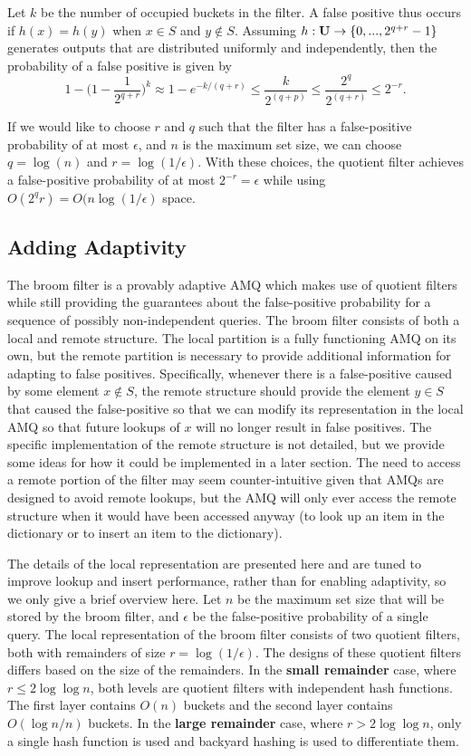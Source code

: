 \documentclass[../paper.tex]{subfiles}
\begin{document}
    Let $k$ be the number of occupied buckets in the filter. A false positive thus occurs if $h(x) =
    h(y)$ when $x \in S$ and $y \notin S$.  Assuming $h: {\bf U} \rightarrow
    \{0, ... , 2^{q+r}-1\}$ generates outputs that are distributed uniformly
    and independently, then the probability of a false positive is given by $$
    1 - \big(1 - \frac{1}{2^{q+r}}\big)^k \approx 1- e^{-k/(q+r)} \leq
    \frac{k}{2^{(q+p)}} \leq \frac{2^q}{2^{(q+r)}} \leq 2^{-r}.$$

    If we would like to choose $r$ and $q$ such that the filter has a false-positive
    probability of at most $\epsilon$, and $n$ is the maximum set size, we can choose $q=\log(n)$
    and $r=\log(1/\epsilon)$.
    With these choices, the quotient filter achieves a false-positive probability of at most
    $2^{-r} = \epsilon$ while using $O(2^q r) = O(n \log (1/\epsilon)$ space.  	

\subsection{Adding Adaptivity}

The broom filter is a provably adaptive AMQ which makes use of quotient filters
while still providing the guarantees about the false-positive probability for
a sequence of possibly non-independent queries. The broom filter consists
of both a local and remote structure. The local partition is a fully functioning
AMQ on its own, but the remote partition is necessary to provide additional
information for adapting to false positives. Specifically, whenever there is
a false-positive caused by some element $x \notin S$, the remote structure
should provide the element $y \in S$ that caused the false-positive so
that we can modify its representation in the local AMQ so that future lookups
of $x$ will no longer result in false positives. The specific implementation
of the remote structure is not detailed, but we provide some ideas for
how it could be implemented in a later section. The need to access a remote
portion of the filter may seem counter-intuitive given that AMQs are designed
to avoid remote lookups, but the AMQ will only ever access the remote structure
when it would have been accessed anyway (to look up an item in the dictionary or
to insert an item to the dictionary).

The details of the local representation are presented here and are tuned to
improve lookup and insert performance, rather than for enabling adaptivity,
so we only give a brief overview here.
Let $n$ be the maximum set size that will be stored by the broom filter, and $\epsilon$
be the false-positive probability of a single query.
The local representation of the broom filter consists of two quotient filters, both
with remainders of size $r=\log(1/\epsilon)$. The designs of these quotient filters
differs based on the size of the remainders. In the \textbf{small remainder} case,
where $r \leq 2 \log \log n$, both levels are quotient filters with independent hash
functions. The first layer contains $O(n)$ buckets and the second layer contains
$O(\log n/n)$ buckets. In the \textbf{large remainder} case, where $r > 2 \log \log n$,
only a single hash function is used and backyard hashing \cite{backyard-hashing} is used
to differentiate them.
\end{document}
